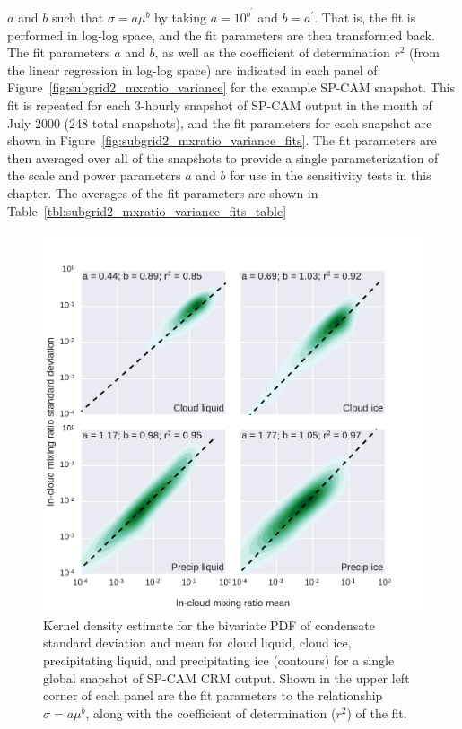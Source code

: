 \(a\) and \(b\) such that \(\sigma = a \mu^b\) by taking
\(a = 10^{b^{\prime}}\) and \(b = a^{\prime}\). That is, the fit is
performed in log-log space, and the fit parameters are then transformed
back. The fit parameters \(a\) and \(b\), as well as the coefficient of
determination \(r^2\) (from the linear regression in log-log space) are
indicated in each panel of Figure~\ref{fig:subgrid2_mxratio_variance}
for the example SP-CAM snapshot. This fit is repeated for each 3-hourly
snapshot of SP-CAM output in the month of July 2000 (248 total
snapshots), and the fit parameters for each snapshot are shown in
Figure~\ref{fig:subgrid2_mxratio_variance_fits}. The fit parameters are
then averaged over all of the snapshots to provide a single
parameterization of the scale and power parameters \(a\) and \(b\) for
use in the sensitivity tests in this chapter. The averages of the fit
parameters are shown in
Table~\ref{tbl:subgrid2_mxratio_variance_fits_table}

\begin{figure}[htbp]
\centering
\includegraphics{graphics/subgrid2_mxratio_variance.pdf}
\caption{\label{fig:subgrid2_mxratio_variance}Kernel density estimate
for the bivariate PDF of condensate standard deviation and mean for
cloud liquid, cloud ice, precipitating liquid, and precipitating ice
(contours) for a single global snapshot of SP-CAM CRM output. Shown in
the upper left corner of each panel are the fit parameters to the
relationship \(\sigma = a \mu^b\), along with the coefficient of
determination (\(r^2\)) of the
fit.}\label{fig:subgrid2ux5fmxratioux5fvariance}
\end{figure}

